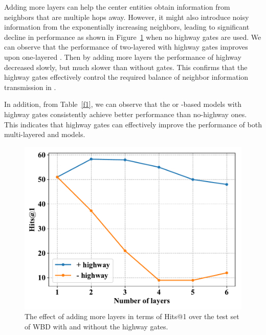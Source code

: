 Adding more \HRGCN layers can help the center entities obtain information from neighbors that are multiple hops away. However, it might also introduce noisy information from the exponentially increasing neighbors, leading to significant decline in performance as shown in Figure~\ref{highway} when no highway gates are used. We can observe that the performance of two-layered \RGCNs with highway gates improves upon one-layered \RGCN. Then by adding more layers the performance of highway \RGCNs decreased slowly, but much slower than \RGCNs without gates. This confirms that the highway gates effectively control the required balance of neighbor information transmission in \RGCNs.

In addition, from Table~\ref{f1}, we can observe that the \GCN or \RGCN-based models with highway gates consistently achieve better performance than no-highway ones. This indicates that highway gates can effectively improve the performance of both multi-layered \GCN and \RGCN models.
\begin{figure}
	\centering
	\includegraphics[width=0.8\linewidth]{figures/graph3.pdf}
	\caption{The effect of adding more \RGCN layers in terms of Hits@1 over the test set of WBD with and without the highway gates.}
	\label{highway}
\end{figure}
